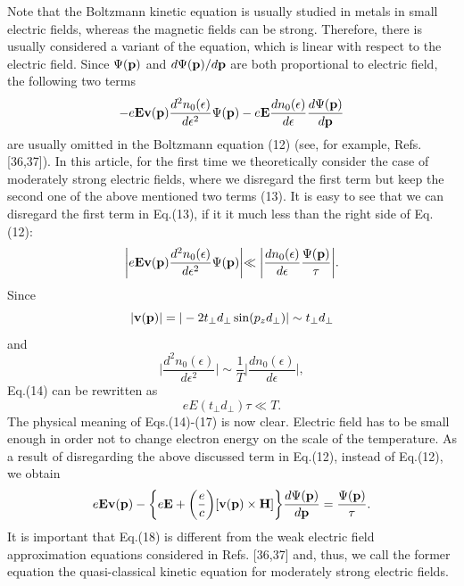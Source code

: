 \documentclass[prl,aps,showpacs,twocolumn,floatfix]{revtex4}
\begin{document}
Note that the Boltzmann kinetic equation is usually studied in
metals in small electric fields, whereas the magnetic fields can
be strong. Therefore, there is usually considered a variant of the
equation, which is linear with respect to the electric field.
Since $\Psi({\bf p})$ and $d \Psi({\bf p})/d {\bf p}$ are both
proportional to electric field, the following two terms
\begin{equation}
-e{\bf E}{\bf v({\bf p})}\frac{d^2 n_0(\epsilon)}{d
\epsilon^2}\Psi ({\bf p}) -  e{\bf E} \frac{d n_0(\epsilon)}{d
\epsilon} \frac{d \Psi({\bf p})}{d \bf p}
\end{equation}
are usually omitted in the Boltzmann equation (12) (see, for
example, Refs.[36,37]). In this article, for the first time we
theoretically consider the case of moderately strong electric
fields, where we disregard the first term but keep the second one
of the above mentioned two terms (13). It is easy to see that we
can disregard the first term in Eq.(13), if it it much less than
the right side of Eq.(12):
\begin{equation}
\biggl| e{\bf E}{\bf v({\bf p})}\frac{d^2 n_0(\epsilon)}{d
\epsilon^2} \Psi({\bf p}) \biggl| \ll \biggl| \frac{d
n_0(\epsilon)}{d \epsilon} \frac{\Psi({\bf p})}{\tau} \bigg|.
\end{equation}
Since
\begin{equation}
|{\bf v}({\bf p})| = |-2t_{\perp} d_{\perp} \sin(p_z d_{\perp})|
\sim t_{\perp} d_{\perp}
\end{equation}
and
\begin{equation}
 \biggl| \frac{d^2 n_0(\epsilon)}{d
\epsilon^2} \biggl| \sim \frac{1}{T} \biggl| \frac{d
n_0(\epsilon)}{d \epsilon} \biggl|,
\end{equation}
Eq.(14) can be rewritten as
\begin{equation}
 eE(t_{\perp} d_{\perp}) \tau \ll T.
\end{equation}
The physical meaning of Eqs.(14)-(17) is now clear. Electric field
has to be small enough in order not to change electron energy on
the scale of the temperature. As a result of disregarding the
above discussed term in Eq.(12), instead of Eq.(12), we obtain
\begin{equation}
e{\bf E}{\bf v({\bf p})} -\biggl\{ e{\bf E} + \biggl( \frac{e}{c}
\biggl) [{\bf v(p)} \times {\bf H}] \biggl\} \frac{d \Psi({\bf
p})}{d \bf p}
 =  \frac{\Psi({\bf p})}{\tau}.
\end{equation}
It is important that Eq.(18) is different from the weak electric
field approximation equations considered in Refs. [36,37] and,
thus, we call the former equation the quasi-classical kinetic
equation for moderately strong electric fields.
\end{document}
